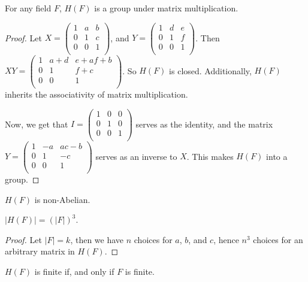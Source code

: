 \begin{lemma}\label{lemma_1.4.4}
  For any field $F$,  $H(F)$ is a group under matrix multiplication.
\end{lemma}
\begin{proof}
  Let $X=\begin{pmatrix}
    1   &   a   &   b   \\
    0   &   1   &   c   \\
    0   &   0   &   1   \\
  \end{pmatrix}$, and
  $Y=\begin{pmatrix}
    1   &   d   &   e   \\
    0   &   1   &   f   \\
    0   &   0   &   1   \\
  \end{pmatrix}$. Then
  $XY=\begin{pmatrix}
    1   &  a+d  &   e+af+b  \\
    0   &   1   &   f+c     \\
    0   &   0   &   1   \\
  \end{pmatrix}$.
  So $H(F)$ is closed. Additionally, $H(F)$ inherits the associativity of
  matrix multiplication.

  Now, we get that $I=\begin{pmatrix}
    1    &   0   &   0   \\
    0    &   1   &   0   \\
    0    &   0   &   1   \\
  \end{pmatrix}$
  serves as the identity, and the matrix $Y=\begin{pmatrix}
    1   &  -a   &   ac-b    \\
    0   &   1   &   -c      \\
    0   &   0   &   1       \\
  \end{pmatrix}$
  serves as an inverse to $X$. This makes  $H(F)$ into a group.
\end{proof}
\begin{corollary}
  $H(F)$ is non-Abelian.
\end{corollary}
\begin{corollary}
  $|H(F)|=(|F|)^3$.
\end{corollary}
\begin{proof}
  Let $|F|=k$, then we have $n$ choices for  $a$,  $b$, and  $c$, hence
  $n^3$ choices for an arbitrary matrix in  $H(F)$.
\end{proof}
\begin{corollary}
  $H(F)$ is finite if, and only if $F$ is finite.
\end{corollary}
